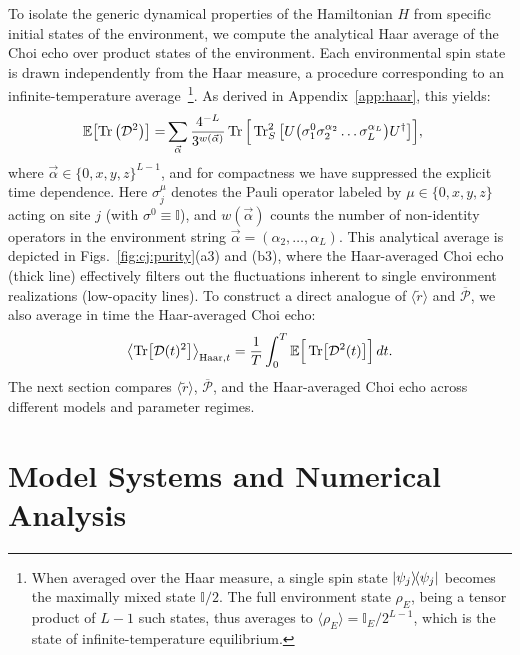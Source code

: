 \documentclass[pra,twocolumn,aps,showpacs,superscriptaddress,longbibliography]{revtex4-2}
\begin{document}
To isolate the generic dynamical properties of the Hamiltonian $H$ from specific initial states of the environment, we compute the analytical Haar average of the Choi echo over product states of the environment. Each environmental spin state is drawn independently from the Haar measure, a procedure corresponding to an infinite-temperature average~\footnote{When averaged over the Haar measure, a single spin state $\dyad{\psi_j}$ becomes the maximally mixed state $\mathbb{I}/2$. The full environment state $\rho_E$, being a tensor product of $L-1$ such states, thus averages to $\langle \rho_E \rangle = \mathbb{I}_E / 2^{L-1}$, which is the state of infinite-temperature equilibrium.}. As derived in Appendix~\ref{app:haar}, this yields:
\begin{align}\label{eq:haar:avg:choi}
\mathbb{E}\bqty{\Tr\pqty{\mathcal{D}^{2}}} =& 
\sum_{\vec{\alpha} }
  \frac{4^{-L}}{3^{w(\vec{\alpha})}}
\Tr \Big[ \Tr_S^2 \big[U
\qty(\sigma_1^0 \sigma_2^{\alpha_2} \ldots \sigma_L^{\alpha_L})
U^\dagger \big] \Big],
\end{align}
where $\vec{\alpha} \in \{0,x,y,z\}^{L-1}$, and for compactness we have  suppressed the explicit time dependence. Here $\sigma_j^\mu$ denotes the Pauli 
operator labeled by $\mu \in \{0,x,y,z\}$ acting on site $j$ (with $\sigma^0 \equiv \mathbb{I}$), 
and $w(\vec{\alpha})$ counts the number of non-identity operators in the 
environment string $\vec{\alpha} = (\alpha_2, \dots, \alpha_L)$. This analytical average is depicted in Figs.~\ref{fig:cj:purity}(a3) and (b3), where the Haar-averaged Choi echo (thick line) effectively filters out the fluctuations inherent to single environment realizations (low-opacity lines). To construct a direct analogue of $\langle \tilde{r} \rangle$ and $\overline{\mathcal{P}}$, we also average in time the Haar-averaged Choi echo:
\begin{equation}\label{eq:avg:CJ}
\expval{\Tr[\mathcal{D}(t)^2]}_{\text{Haar}, t} = \frac{1}{T}
\int_{0}^{T} \mathbb{E}\Big[\Tr[\mathcal{D}^{2}(t)]\Big] \, dt .
\end{equation}
The next section compares $\langle \tilde{r} \rangle$, $\overline{\mathcal{P}}$, and the Haar-averaged Choi echo across different models and parameter regimes.
%
\section{Model Systems and Numerical Analysis}\label{sec:models_results}
\end{document}
